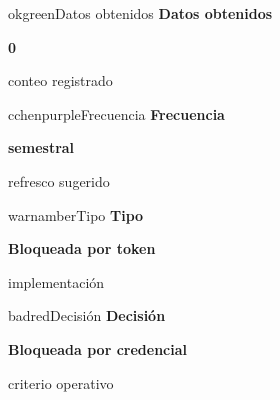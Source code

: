 \documentclass[9pt,a4paper]{extarticle}
\begin{document}
\vspace{0.04cm}
\begin{minipage}{0.24\textwidth}
\begin{metricbox}{okgreen}{Datos obtenidos}
{\large\bfseries Datos obtenidos}\par
{\Large\bfseries 0}\par
{\normalsize conteo registrado}
\end{metricbox}
\end{minipage}\hfill
\begin{minipage}{0.24\textwidth}
\begin{metricbox}{cchenpurple}{Frecuencia}
{\large\bfseries Frecuencia}\par
{\large\bfseries semestral}\par
{\normalsize refresco sugerido}
\end{metricbox}
\end{minipage}\hfill
\begin{minipage}{0.24\textwidth}
\begin{metricbox}{warnamber}{Tipo}
{\large\bfseries Tipo}\par
{\normalsize\bfseries Bloqueada por token}\par
{\normalsize implementación}
\end{metricbox}
\end{minipage}\hfill
\begin{minipage}{0.24\textwidth}
\begin{metricbox}{badred}{Decisión}
{\large\bfseries Decisión}\par
{\normalsize\bfseries Bloqueada por credencial}\par
{\normalsize criterio operativo}
\end{metricbox}
\end{minipage}
\end{document}
